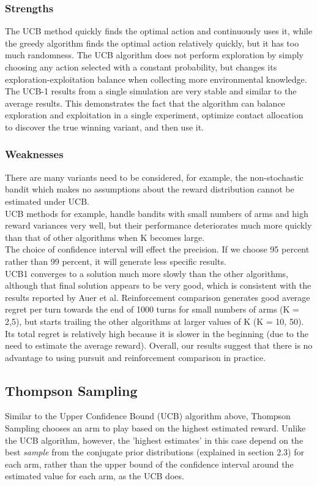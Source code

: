 \subsubsection{Strengths}
The UCB method quickly finds the optimal action and continuously uses it, while the greedy algorithm finds the optimal action relatively quickly, but it has too much randomness.
The UCB algorithm does not perform exploration by simply choosing any action selected with a constant probability, but changes its exploration-exploitation balance when collecting more environmental knowledge. 
\\The UCB-1 results from a single simulation are very stable and similar to the average results. This demonstrates the fact that the algorithm can balance exploration and exploitation in a single experiment, optimize contact allocation to discover the true winning variant, and then use it.
\subsubsection{Weaknesses}
There are many variants need to be considered, for example, the non-stochastic bandit which makes no assumptions about the reward distribution cannot be estimated under UCB. 
\\UCB methods for example, handle bandits with small numbers of arms and high reward variances very well, but their performance deteriorates much more quickly than that of other algorithms when K becomes large.\citep{Kuleshov}
\\The choice of confidence interval will effect the precision. If we choose 95 percent rather than 99 percent, it will generate less specific results.
\\UCB1 converges to a solution much more slowly than the other algorithms, although that final solution appears to be very good, which is consistent with the results reported by Auer et al. Reinforcement comparison generates good average regret per turn towards the end of 1000 turns for small numbers of arms (K = 2,5), but starts trailing the other algorithms at larger values of K (K = 10, 50). Its total regret is relatively high because it is slower in the beginning (due to the need to estimate the average reward). Overall, our results suggest that there is no advantage to using pursuit and reinforcement comparison in practice. \citep{Kuleshov}
\subsection{Thompson Sampling}
Similar to the Upper Confidence Bound (UCB) algorithm above, Thompson Sampling chooses an arm to play based on the highest estimated reward. Unlike the UCB algorithm, however, the 'highest estimates' in this case depend on the best \emph{sample} from the conjugate prior distributions (explained in section 2.3) for each arm, rather than the upper bound of the confidence interval around the estimated value for each arm, as the UCB does. 

